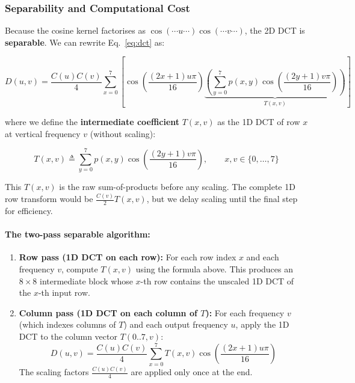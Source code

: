 \subsubsection{Separability and Computational Cost}

Because the cosine kernel factorises as $\cos(\cdots u\cdots)\cos(\cdots v\cdots)$, the 2D DCT is \textbf{separable}. We can rewrite Eq.~\eqref{eq:dct} as:

\begin{equation}
\boxed{
  D(u,v) = \frac{C(u)C(v)}{4} \sum_{x=0}^{7} \left[
    \cos\!\left(\frac{(2x+1)u\pi}{16}\right)
    \underbrace{\left( \sum_{y=0}^{7} p(x,y) \cos\!\left(\frac{(2y+1)v\pi}{16}\right) \right)}_{T(x,v)}
  \right]
}
\label{eq:separable}
\end{equation}

where we define the \textbf{intermediate coefficient} $T(x,v)$ as the 1D DCT of row $x$ at vertical frequency $v$ (without scaling):

\begin{equation}
  T(x,v) \triangleq \sum_{y=0}^{7} p(x,y) \cos\!\left(\frac{(2y+1)v\pi}{16}\right), \qquad x,v \in \{0,\ldots,7\}
\end{equation}

This $T(x,v)$ is the raw sum-of-products before any scaling. The complete 1D row transform would be $\frac{C(v)}{2} T(x,v)$, but we delay scaling until the final step for efficiency.

\paragraph{The two-pass separable algorithm:}

\begin{enumerate}[nosep]
    \item \textbf{Row pass (1D DCT on each row):} 
    For each row index $x$ and each frequency $v$, compute $T(x,v)$ using the formula above. This produces an $8\times8$ intermediate block whose $x$-th row contains the unscaled 1D DCT of the $x$-th input row.
    
    \item \textbf{Column pass (1D DCT on each column of $T$):} 
    For each frequency $v$ (which indexes columns of $T$) and each output frequency $u$, apply the 1D DCT to the column vector $T(0..7, v)$:
    \begin{equation}
      D(u,v) = \frac{C(u)C(v)}{4} \sum_{x=0}^{7} T(x,v) \cos\!\left(\frac{(2x+1)u\pi}{16}\right)
    \end{equation}
    The scaling factors $\frac{C(u)C(v)}{4}$ are applied only once at the end.
\end{enumerate}

